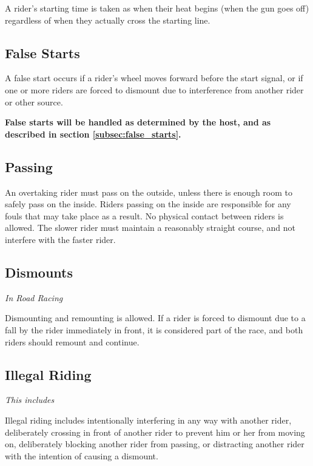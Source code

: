 A rider's starting time is taken as when their heat begins (when the gun goes off) regardless of when they actually cross the starting line.

\subsection{False Starts}

A false start occurs if a rider's wheel moves forward before the start signal, or if one or more riders are forced to dismount due to interference from another rider or other source.

\textbf{False starts will be handled as determined by the host, and as described in section \ref{subsec:false_starts}.}

\subsection{Passing}

An overtaking rider must pass on the outside, unless there is enough room to safely pass on the inside.
Riders passing on the inside are responsible for any fouls that may take place as a result.
No physical contact between riders is allowed.
The slower rider must maintain a reasonably straight course, and not interfere with the faster rider.

\subsection{Dismounts}

\textit{In Road Racing} 

Dismounting and remounting is allowed. 
If a rider is forced to dismount due to a fall by the rider immediately in front, it is considered part of the race, and both riders should remount and continue.

\subsection{Illegal Riding}

\textit{This includes}

Illegal riding includes intentionally interfering in any way with another rider, deliberately crossing in front of another rider to prevent him or her from moving on, deliberately blocking another rider from passing, or distracting another rider with the intention of causing a dismount.

